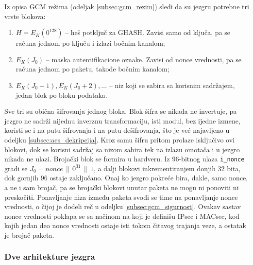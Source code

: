 Iz opisa GCM režima (odeljak \ref{subsec:gcm_rezim}) sledi da su jezgru potrebne tri vrste blokova:
\begin{enumerate}[itemsep=2pt]
    \item $H = E_K(0^{128})$ -- heš potključ za GHASH. Zavisi samo od ključa, pa se računa jednom po ključu i izlazi bočnim kanalom;
    \item $E_K(J_0)$ -- maska autentifikacione oznake. Zavisi od nonce vrednosti, pa se računa jednom po paketu, takođe bočnim kanalom;
    \item $E_K(J_0+1), E_K(J_0+2), \ldots$ -- niz koji se sabira sa korisnim sadržajem, jedan blok po bloku podataka.
\end{enumerate}
Sve tri su obična šifrovanja jednog bloka. Blok šifra se nikada ne invertuje, pa jezgro ne sadrži nijednu inverznu transformaciju, isti modul, bez ijedne izmene, koristi se i na putu šifrovanja i na putu dešifrovanja, što je već najavljeno u odeljku \ref{subsec:aes_dekripcija}. Kroz samu šifru pritom prolaze isključivo ovi blokovi, dok se korisni sadržaj sa nizom sabira tek na izlazu omotača i u jezgro nikada ne ulazi.
\smallbreak
Brojački blok se formira u hardveru. Iz 96-bitnog ulaza \texttt{i\_nonce} gradi se $J_0 = \mathit{nonce} \,\|\, 0^{31} \,\|\, 1$, a dalji blokovi inkrementiranjem donjih 32 bita, dok gornjih 96 ostaje zaključano. Onaj ko jezgro pokreće bira, dakle, samo nonce, a ne i sam brojač, pa se brojački blokovi unutar paketa ne mogu ni ponoviti ni preskočiti. Ponavljanje niza između paketa svodi se time na ponavljanje nonce vrednosti, o čijoj je dodeli reč u odeljku \ref{subsec:gcm_sigurnost}. Ovakav sastav nonce vrednosti poklapa se sa načinom na koji je definišu IPsec \cite{rfc4106} i MACsec, kod kojih jedan deo nonce vrednosti ostaje isti tokom čitavog trajanja veze, a ostatak je brojač paketa.

\subsubsection{Dve arhitekture jezgra}
\label{subsec:hw_aes_arh}

